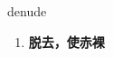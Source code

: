 
\begin{frame}
{\huge denude}
\begin{center}
\begin{enumerate}\Large
  \item \textbf{脱去，使赤裸}
\end{enumerate}
\end{center}
\end{frame}
